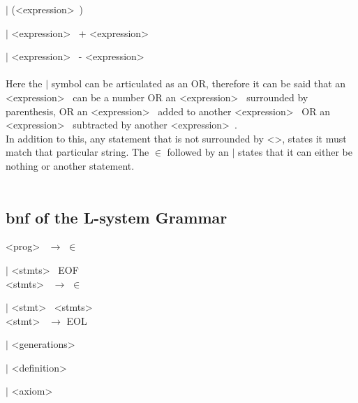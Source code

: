 \hspace{2cm} $|$ (\textless expression\textgreater~) 

\hspace{2cm} $|$ \textless expression\textgreater~ + \textless expression\textgreater~ 

\hspace{2cm} $|$ \textless expression\textgreater~ - \textless expression\textgreater~ \\
\\
Here the $|$ symbol can be articulated as an OR, therefore it can be said that an \textless expression\textgreater~ can be a number OR an \textless expression\textgreater~ surrounded by parenthesis, OR an \textless expression\textgreater~ added to another \textless expression\textgreater~ OR an \textless expression\textgreater~ subtracted by another \textless expression\textgreater~. 
\\
In addition to this, any statement that is not surrounded by \textless \textgreater, states it must match that particular string. The $\in$ followed by an $|$ states that it can either be nothing or another statement. \\
\\


\newpage 
\subsection{\acrlong{bnf} of the L-system Grammar} \label{L-system Grammar}

\noindent
\textless prog\textgreater~ $\rightarrow$ $\in$ 

\hspace{2cm} $|$  \textless stmts\textgreater~ EOF \\



\noindent
\textless stmts\textgreater~ $\rightarrow$ $\in$

\hspace{2cm} $|$ \textless stmt\textgreater~ \textless stmts\textgreater~ \\


\noindent
\textless stmt\textgreater~ $\rightarrow$ EOL 

\hspace{2cm} $|$ \textless generations\textgreater~

\hspace{2cm} $|$ \textless definition\textgreater~

\hspace{2cm} $|$ \textless axiom\textgreater~

